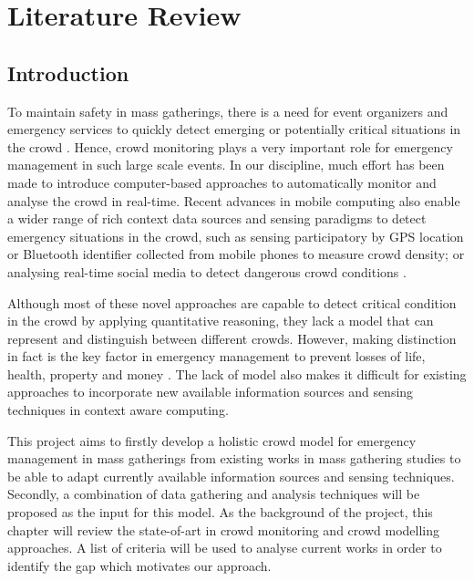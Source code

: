 \chapter{Literature Review}
\label{ch:litReview}
\ifpdf
    \graphicspath{{Chapter2/Figs/Raster/}{Chapter2/Figs/PDF/}{Chapter2/Figs/}}
\else
    \graphicspath{{Chapter2/Figs/Vector/}{Chapter2/Figs/}}
\fi

\section{Introduction}

To maintain safety in mass gatherings, there is a need for event organizers and emergency services to quickly detect emerging or potentially critical situations in the crowd \citep{Wirz2012} . Hence, crowd monitoring plays a very important role for emergency management in such large scale events. In our discipline, much effort has been made to introduce computer-based approaches to automatically monitor and analyse the crowd in real-time. Recent advances in mobile computing also enable a wider range of rich context data sources and sensing paradigms to detect emergency situations in the crowd, such as sensing participatory by GPS location \citep{Wirz2012} or Bluetooth identifier \citep{Weppner2013} collected from mobile phones to measure crowd density; or analysing real-time social media to detect dangerous crowd conditions \citep{DelirHaghighi2013}.

Although most of these novel approaches are capable to detect critical condition in the crowd by applying quantitative reasoning, they lack a model that can represent and distinguish between different crowds. However, making distinction in fact is the key factor in emergency management to prevent losses of life, health, property and money \citep{Berlonghi1995}. The lack of model also makes it difficult for existing approaches to incorporate new available information sources and sensing techniques in context aware computing.

This project aims to firstly develop a holistic crowd model for emergency management in mass gatherings from existing works in mass gathering studies to be able to adapt currently available information sources and sensing techniques. Secondly, a combination of data gathering and analysis techniques will be proposed as the input for this model.
As the background of the project, this chapter will review the state-of-art in crowd monitoring and crowd modelling approaches. A list of criteria will be used to analyse current works in order to identify the gap which motivates our approach.

